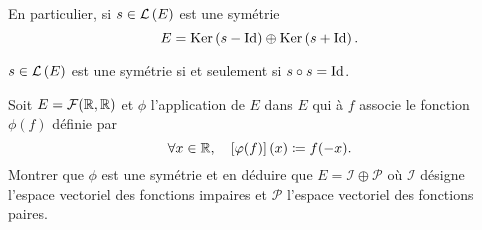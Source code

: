 \documentclass{magnolia}
\begin{document}
\begin{remarqueUnique}
\remarque[utile=1] En particulier, si $s\in\mathcal{L}\left(E\right)$ est une symétrie
  \[E=\mathop{\rm Ker}\left(s-\operatorname{Id}\right)\oplus\mathop{\rm Ker}\left(s+\operatorname{Id}\right).\]
\end{remarqueUnique}

\begin{proposition}[utile=3]
$s\in\mathcal{L}\left(E\right)$ est une symétrie si et seulement si $s\circ s=\operatorname{Id}$.  
\end{proposition}

\begin{exoUnique}
\exo Soit $E=\mathcal{F}(\mathbb{R},\mathbb{R})$ et $\phi$ l'application de $E$ dans $E$
  qui à $f$ associe le fonction $\phi(f)$ définie par
	\[\forall x\in\mathbb{R} ,\quad \left[\varphi(f)\right](x)\coloneqq f(-x).\]
	Montrer que $\phi$ est une symétrie et en déduire
  que $E=\mathcal{I}\oplus\mathcal{P}$ où $\mathcal{I}$ désigne l'espace
  vectoriel des fonctions impaires et $\mathcal{P}$ l'espace vectoriel
  des fonctions paires.
\end{exoUnique}





\end{document}
